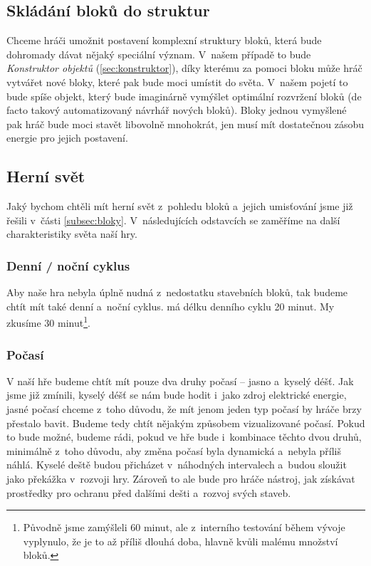 \subsection{Skládání bloků do struktur}

Chceme hráči umožnit postavení komplexní struktury bloků, která bude dohromady dávat nějaký speciální význam. V~našem případě to bude \textit{Konstruktor objektů} (\ref{sec:konstruktor}), díky kterému za pomoci bloku  může hráč vytvářet nové bloky, které pak bude moci umístit do světa. V~našem pojetí to bude spíše objekt, který bude imaginárně vymýšlet optimální rozvržení bloků (de facto takový automatizovaný návrhář nových bloků). Bloky jednou vymyšlené pak hráč bude moci stavět libovolně mnohokrát, jen musí mít dostatečnou zásobu energie pro jejich postavení.

\subsection{Herní svět}

Jaký bychom chtěli mít herní svět z~pohledu bloků a~jejich umisťování jsme již řešili v~části \ref{subsec:bloky}. V~následujících odstavcích se zaměříme na další charakteristiky světa naší hry.

\subsubsection{Denní / noční cyklus}
Aby naše hra nebyla úplně nudná z~nedostatku stavebních bloků, tak budeme chtít mít také denní a~noční cyklus. \MC{} má délku denního cyklu 20 minut. My zkusíme 30 minut\footnote{Původně jsme zamýšleli 60 minut, ale z~interního testování během vývoje vyplynulo, že je to až příliš dlouhá doba, hlavně kvůli malému množství bloků.}.

\subsubsection{Počasí}
\label{subsubsec:weather}

V naší hře budeme chtít mít pouze dva druhy počasí -- jasno a~kyselý déšť. Jak jsme již zmínili, kyselý déšť se nám bude hodit i~jako zdroj elektrické energie, jasné počasí chceme z~toho důvodu, že mít jenom jeden typ počasí by hráče brzy přestalo bavit. Budeme tedy chtít nějakým způsobem vizualizované počasí. Pokud to bude možné, budeme rádi, pokud ve hře bude i~kombinace těchto dvou druhů, minimálně z~toho důvodu, aby změna počasí byla dynamická a~nebyla příliš náhlá. Kyselé deště budou přicházet v~náhodných intervalech a~budou sloužit jako překážka v~rozvoji hry. Zároveň to ale bude pro hráče nástroj, jak získávat prostředky pro ochranu před dalšími dešti a~rozvoj svých staveb. 

